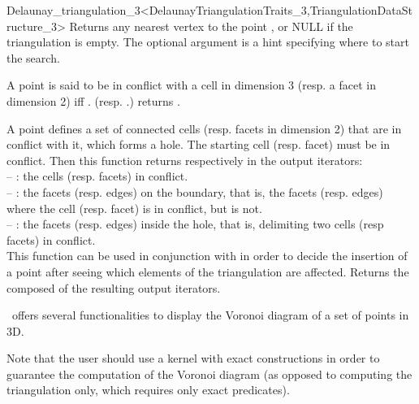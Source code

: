 \begin{ccRefClass}{Delaunay_triangulation_3<DelaunayTriangulationTraits_3,TriangulationDataStructure_3>}
{Returns any nearest vertex to the point , or NULL if the triangulation
is empty.  The optional argument  is a hint specifying where to start
the search.  
}

A point  is said to be in conflict with a cell  in dimension 3
(resp. a facet  in dimension 2) iff \ccVar.
(resp. \ccVar.) returns .

{A point  defines a set of connected cells (resp. facets in dimension
2) that are in conflict with it, which forms a hole.  The starting cell
(resp.  facet)  must be in conflict.  Then this function returns
respectively in the output iterators:\\
-- : the cells (resp. facets) in conflict.\\
-- : the facets (resp. edges) on the boundary, that is, the facets
(resp. edges)  where the cell (resp. facet)  is in
conflict, but  is not.\\
-- : the facets (resp. edges) inside the hole, that is, delimiting
two cells (resp facets) in conflict.\\
This function can be used in conjunction with  in order
to decide the insertion of a point after seeing which elements of the
triangulation are affected.
Returns the  composed of the resulting output iterators.
}

\cgal\ offers several functionalities to display the Voronoi diagram of 
a set of points in 3D.

Note that the user should use a kernel with exact constructions in order
to guarantee the computation of the Voronoi diagram (as opposed to computing
the triangulation only, which requires only exact predicates).


\end{ccRefClass}
